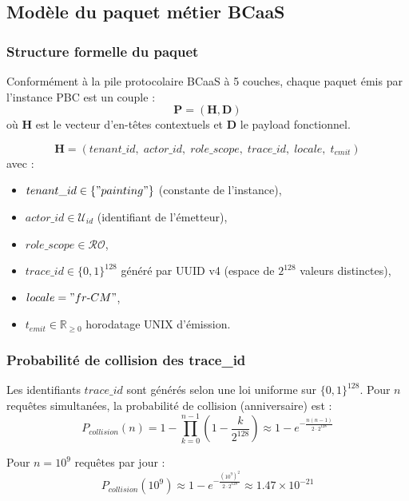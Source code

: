 \documentclass[12pt,a4paper]{report}
\begin{document}
\subsection{Modèle du paquet métier BCaaS}

\subsubsection*{Structure formelle du paquet}

Conformément à la pile protocolaire BCaaS à 5 couches, chaque paquet émis par
l'instance PBC est un couple :
\[
\mathbf{P} = (\mathbf{H}, \mathbf{D})
\]
où $\mathbf{H}$ est le vecteur d'en-têtes contextuels et $\mathbf{D}$ le payload fonctionnel.

\begin{definition}
\[
\mathbf{H} = (tenant\_id,\; actor\_id,\; role\_scope,\; trace\_id,\; locale,\; t_{emit})
\]
avec :
\begin{itemize}
  \item $tenant\_id \in \{"painting"\}$ (constante de l'instance),
  \item $actor\_id \in \mathcal{U}_{id}$ (identifiant de l'émetteur),
  \item $role\_scope \in \mathcal{R\!O}$,
  \item $trace\_id \in \{0,1\}^{128}$ généré par UUID v4 (espace de $2^{128}$ valeurs distinctes),
  \item $locale = "fr\text{-}CM"$,
  \item $t_{emit} \in \mathbb{R}_{\geq 0}$ horodatage UNIX d'émission.
\end{itemize}
\end{definition}

\subsubsection*{Probabilité de collision des trace\_id}

Les identifiants $trace\_id$ sont générés selon une loi uniforme sur $\{0,1\}^{128}$.
Pour $n$ requêtes simultanées, la probabilité de collision (anniversaire) est :
\[
P_{collision}(n) = 1 - \prod_{k=0}^{n-1}\left(1 - \frac{k}{2^{128}}\right) \approx 1 - e^{-\frac{n(n-1)}{2 \cdot 2^{128}}}
\]

Pour $n = 10^9$ requêtes par jour :
\[
P_{collision}(10^9) \approx 1 - e^{-\frac{(10^9)^2}{2 \cdot 2^{128}}} \approx 1.47 \times 10^{-21}
\]
\end{document}
